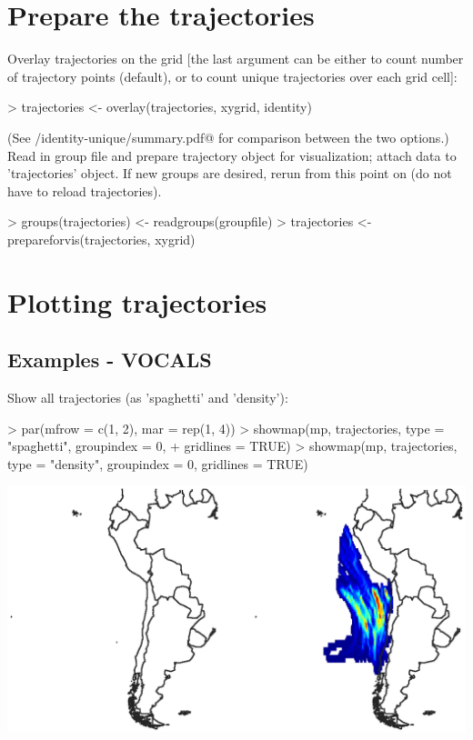 \documentclass{article}
\renewenvironment{Schunk}{\vspace{\topsep}}{\vspace{\topsep}}
\begin{document}
\section{Prepare the trajectories}


Overlay trajectories on the grid [the last argument can be either
\verb@identity@ to count number of trajectory points (default), or
\verb@unique@ to count unique trajectories over each grid cell]:

\begin{Schunk}
\begin{Sinput}
> trajectories <- overlay(trajectories, xygrid, identity)
\end{Sinput}
\end{Schunk}

(See \verb@reports/identity-unique/summary.pdf@ for comparison between
the two options.)\\

Read in group file and prepare trajectory object for visualization; attach data
to 'trajectories' object. If new groups are desired, rerun from this point on
(do not have to reload trajectories).

\begin{Schunk}
\begin{Sinput}
> groups(trajectories) <- readgroups(groupfile)
> trajectories <- prepareforvis(trajectories, xygrid)
\end{Sinput}
\end{Schunk}

\section{Plotting trajectories}

\subsection{Examples - VOCALS}
Show all trajectories (as 'spaghetti' and 'density'):

\begin{Schunk}
\begin{Sinput}
> par(mfrow = c(1, 2), mar = rep(1, 4))
> showmap(mp, trajectories, type = "spaghetti", groupindex = 0, 
+     gridlines = TRUE)
> showmap(mp, trajectories, type = "density", groupindex = 0, gridlines = TRUE)
\end{Sinput}
\end{Schunk}
\includegraphics{figures/fig-015}
\end{document}
